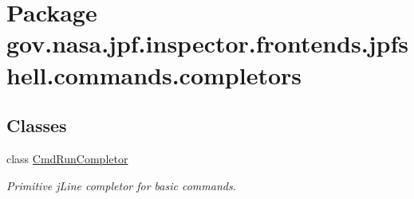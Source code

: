 \hypertarget{namespacegov_1_1nasa_1_1jpf_1_1inspector_1_1frontends_1_1jpfshell_1_1commands_1_1completors}{}\section{Package gov.\+nasa.\+jpf.\+inspector.\+frontends.\+jpfshell.\+commands.\+completors}
\label{namespacegov_1_1nasa_1_1jpf_1_1inspector_1_1frontends_1_1jpfshell_1_1commands_1_1completors}
\subsection*{Classes}
\begin{DoxyCompactItemize}
\item 
class \hyperlink{classgov_1_1nasa_1_1jpf_1_1inspector_1_1frontends_1_1jpfshell_1_1commands_1_1completors_1_1_cmd_run_completor}{Cmd\+Run\+Completor}
\begin{DoxyCompactList}\small\item\em Primitive j\+Line completor for basic commands. \end{DoxyCompactList}\end{DoxyCompactItemize}
